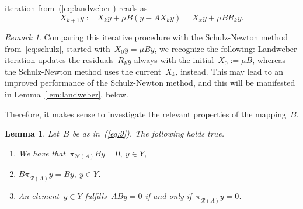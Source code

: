 \documentclass[12pt]{amsart}
\newcommand{\lr}[1]{\left(#1\right)}
\newcommand{\range}{\mathcal R}
\newcommand{\N}{\mathcal N}
\newcommand{\pr}{\pi_{\overline{\range(A)}}}
\newtheorem{lemma}{Lemma}
\theoremstyle{remark}
\newtheorem{remark}{Remark}
\begin{document}
iteration from~(\ref{eq:landweber}) reads as
\begin{equation}
  \label{eq:LandweberB}
  X_{k+1}y := X_{k}y + \mu B\lr{y - A {X_{k}y}} = X_{x}y + \mu B R_{k}y.
\end{equation}
\begin{remark}  
Comparing this iterative procedure with the Schulz-Newton method from~\eqref{eq:schulz}, started with~$X_0y = \mu B y$, we recognize the following: Landweber iteration updates the residuals~$R_ky$ always with the initial~$X_0:=\mu B$, whereas the Schulz-Newton method uses the current~$X_k$, instead.   This may lead to an improved performance of the Schulz-Newton method, and this will be manifested in Lemma~\ref{lem:landweber}, below. 
\end{remark}
Therefore, it makes sense to investigate the relevant properties of the mapping~$B$.
\begin{lemma}\label{lem:B}
  Let~$B$ be as in~(\ref{eq:9}). The following holds true.
  \begin{enumerate}
  \item\label{it:Bpi} We have that~$\pi_{\N(A)}B y=0,\ y\in Y$,
    \item \label{it:piB}$B \pr y = B y,\ y\in Y$.
  \item An element~$y\in Y$ fulfills~$A B y=0$ if and only if~$\pr y=0$.
  \end{enumerate}
\end{lemma}
\end{document}

